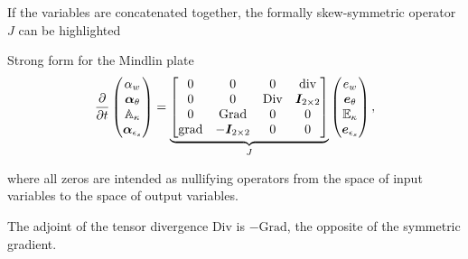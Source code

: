 \documentclass{beamer}
\begin{document}
\begin{frame}
	If the variables are concatenated together, the formally skew-symmetric operator $J$ can be highlighted 
	\begin{exampleblock}{Strong form for the Mindlin plate}
	\begin{equation*}
		\diffp{}{t}
		\begin{pmatrix}
		\alpha_w \\
		\bm\alpha_\theta \\
		\mathbb{A}_\kappa \\
		\bm\alpha_{\epsilon_s} \\
		\end{pmatrix} = 
		\underbrace{\begin{bmatrix}
		0  & 0  & 0  & \mathrm{div} \\
		0 & 0 &  \mathrm{Div} & \bm{I}_{2 \times 2}\\
		0  & \mathrm{Grad}  & 0  & 0\\
		\mathrm{grad} & -\bm{I}_{2 \times 2} &  0 & 0  \\
		\end{bmatrix}}_{J}
		\begin{pmatrix}
		e_w \\
		\bm{e}_{\theta} \\
		\mathbb{E}_{\kappa} \\
		\bm{e}_{\epsilon_s} \\
		\end{pmatrix},
	\end{equation*}
	\end{exampleblock}

	where all zeros are intended as nullifying operators from the space of input variables to the space of output variables.
	
	\begin{theorem}
	The adjoint of the tensor divergence $\mathrm{Div}$ is $- \mathrm{Grad}$, the opposite of the symmetric gradient.
	\end{theorem}
\end{frame}
\end{document}
